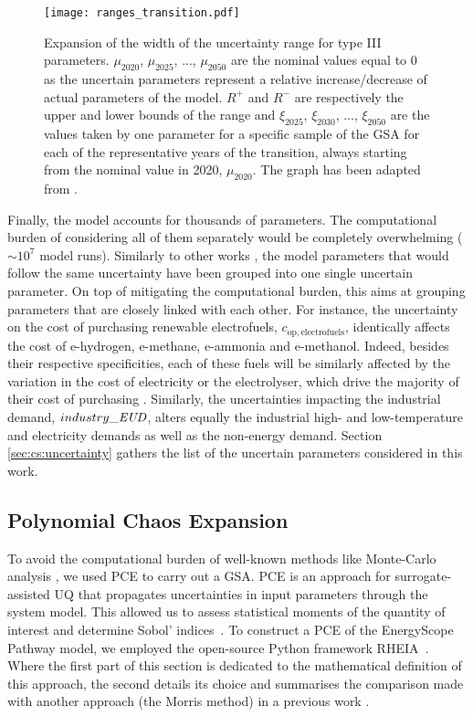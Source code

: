 \begin{figure}[htbp!]
\centering
\texttt{[image: ranges\_transition.pdf]}
\caption{Expansion of the width of the uncertainty range for type III parameters. $\mu_{2020}$, $\mu_{2025}$, ...,  $\mu_{2050}$ are the nominal values equal to 0 as the uncertain parameters represent a relative increase/decrease of actual parameters of the model. $R^+$ and $R^-$ are respectively the upper and lower bounds of the range and $\xi_{2025}$, $\xi_{2030}$, ...,  $\xi_{2050}$ are the values taken by one parameter for a specific sample of the \gls{GSA} for each of the representative years of the transition, always starting from the nominal value in 2020, $\mu_{2020}$. The graph has been adapted from \cite{guevara2022modeling}.}
\label{fig:ranges_transition}
\end{figure}

Finally, the model accounts for thousands of parameters. The computational burden of considering all of them separately would be completely overwhelming ($\sim 10^7$ model runs). Similarly to other works \cite{Moret2017,limpens2020impact}, the model parameters that would follow the same uncertainty have been grouped into one single uncertain parameter. On top of mitigating the computational burden, this aims at grouping parameters that are closely linked with each other. For instance, the uncertainty on the cost of purchasing renewable electrofuels, $c_{\mathrm{op,electrofuels}}$, identically affects the cost of e-hydrogen, e-methane, e-ammonia and e-methanol. Indeed, besides their respective specificities, each of these fuels will be similarly affected by the variation in the cost of electricity or the electrolyser, which drive the majority of their cost of purchasing \cite{h2coalition}. Similarly, the uncertainties impacting the industrial demand, $industry\_\emph{EUD}$, alters equally the industrial high- and low-temperature and electricity demands as well as the non-energy demand. Section \ref{sec:cs:uncertainty} gathers the list of the uncertain parameters considered in this work.

\subsection{Polynomial Chaos Expansion}
\label{subsec:pce}

To avoid the computational burden of well-known methods like Monte-Carlo analysis \cite{yue2018review}, we used \gls{PCE} to carry out a \gls{GSA}. \gls{PCE} is an approach for surrogate-assisted \gls{UQ} that propagates uncertainties in input parameters through the system model. This allowed us to assess statistical moments of the quantity of interest and determine Sobol' indices~\cite{coppitters2020robust}. To construct a PCE of the EnergyScope Pathway model, we employed the open-source Python framework RHEIA~\cite{coppitters2022rheia,readthedocs_rheia}. Where the first part of this section is dedicated to the mathematical definition of this approach, the second details its choice and summarises the comparison made with another approach (\ie the Morris method) in a previous work \cite{limpens2020impact}.\\

